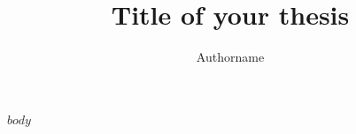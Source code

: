 \documentclass[department=cse,degree=phd,book=proposal,backref=page,spacing=single]{common/iiththesis}
\title{Title of your thesis}
\author{Authorname}
\begin{document}
$body$
\clearpage
\newpage


\end{document}
